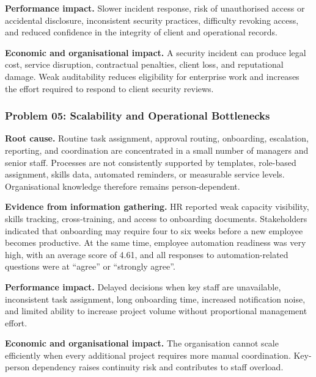 \documentclass[12pt,a4paper]{report}
\begin{document}
\textbf{Performance impact.} Slower incident response, risk of unauthorised access or
accidental disclosure, inconsistent security practices, difficulty revoking access, and reduced
confidence in the integrity of client and operational records.

\textbf{Economic and organisational impact.} A security incident can produce legal cost, service
disruption, contractual penalties, client loss, and reputational damage. Weak auditability
reduces eligibility for enterprise work and increases the effort required to respond to client
security reviews.

\subsubsection{Problem 05: Scalability and Operational Bottlenecks}
\textbf{Root cause.} Routine task assignment, approval routing, onboarding, escalation,
reporting, and coordination are concentrated in a small number of managers and senior staff.
Processes are not consistently supported by templates, role-based assignment, skills data,
automated reminders, or measurable service levels. Organisational knowledge therefore remains
person-dependent.

\textbf{Evidence from information gathering.} HR reported weak capacity visibility, skills
tracking, cross-training, and access to onboarding documents. Stakeholders indicated that
onboarding may require four to six weeks before a new employee becomes productive. At the same
time, employee automation readiness was very high, with an average score of 4.61, and all
responses to automation-related questions were at ``agree'' or ``strongly agree''.

\textbf{Performance impact.} Delayed decisions when key staff are unavailable, inconsistent task
assignment, long onboarding time, increased notification noise, and limited ability to increase
project volume without proportional management effort.

\textbf{Economic and organisational impact.} The organisation cannot scale efficiently when
every additional project requires more manual coordination. Key-person dependency raises
continuity risk and contributes to staff overload.
\end{document}
